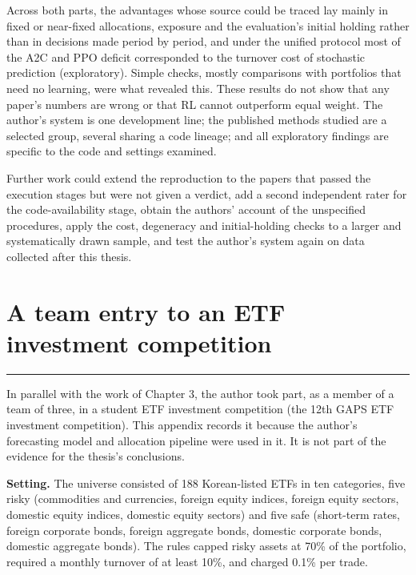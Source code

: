 \documentclass[12pt,a4paper]{report}
\begin{document}
Across both parts, the advantages whose source could be traced lay
mainly in fixed or near-fixed allocations, exposure and the evaluation's
initial holding rather than in decisions made period by period, and
under the unified protocol most of the A2C and PPO deficit corresponded
to the turnover cost of stochastic prediction (exploratory). Simple
checks, mostly comparisons with portfolios that need no learning, were
what revealed this. These results do not show that any paper's numbers
are wrong or that RL cannot outperform equal weight. The author's system
is one development line; the published methods studied are a selected
group, several sharing a code lineage; and all exploratory findings are
specific to the code and settings examined.

Further work could extend the reproduction to the papers that passed the
execution stages but were not given a verdict, add a second independent
rater for the code-availability stage, obtain the authors' account of
the unspecified procedures, apply the cost, degeneracy and
initial-holding checks to a larger and systematically drawn sample, and
test the author's system again on data collected after this thesis.

\appendix

\chapter{A team entry to an ETF investment
competition}\label{appendix-a.-a-team-entry-to-an-etf-investment-competition}

\begin{center}\rule{0.5\linewidth}{0.5pt}\end{center}

In parallel with the work of Chapter 3, the author took part, as a
member of a team of three, in a student ETF investment competition (the
12th GAPS ETF investment competition). This appendix records it because
the author's forecasting model and allocation pipeline were used in it.
It is not part of the evidence for the thesis's conclusions.

\textbf{Setting.} The universe consisted of 188 Korean-listed ETFs in
ten categories, five risky (commodities and currencies, foreign equity
indices, foreign equity sectors, domestic equity indices, domestic
equity sectors) and five safe (short-term rates, foreign corporate
bonds, foreign aggregate bonds, domestic corporate bonds, domestic
aggregate bonds). The rules capped risky assets at 70\% of the
portfolio, required a monthly turnover of at least 10\%, and charged
0.1\% per trade.
\end{document}
